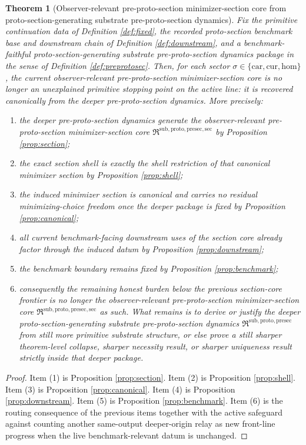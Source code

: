 \documentclass[11pt]{article}
\newcommand{\Car}{\mathrm{car}}
\newcommand{\Cur}{\mathrm{cur}}
\newcommand{\Hom}{\mathrm{hom}}
\newcommand{\PreProtoSectionPackage}{\mathfrak R^{\mathrm{sub,proto,presec}}}
\newcommand{\PreProtoSectionMinSectionCore}{\mathfrak R^{\mathrm{sub,proto,presec,sec}}}
\newtheorem{theorem}{Theorem}
\begin{document}
\begin{theorem}[Observer-relevant pre-proto-section minimizer-section core from proto-section-generating substrate pre-proto-section dynamics]
\label{thm:main}
Fix the primitive continuation data of Definition \ref{def:fixed}, the recorded proto-section benchmark base and downstream chain of Definition \ref{def:downstream}, and a benchmark-faithful proto-section-generating substrate pre-proto-section dynamics package in the sense of Definition \ref{def:preprotosec}. Then, for each sector \(\sigma\in\{\Car,\Cur,\Hom\}\), the current observer-relevant pre-proto-section minimizer-section core is no longer an unexplained primitive stopping point on the active line: it is recovered canonically from the deeper pre-proto-section dynamics. More precisely:
\begin{enumerate}
    \item the deeper pre-proto-section dynamics generate the observer-relevant pre-proto-section minimizer-section core \(\PreProtoSectionMinSectionCore\) by Proposition \ref{prop:section};
    \item the exact section shell is exactly the shell restriction of that canonical minimizer section by Proposition \ref{prop:shell};
    \item the induced minimizer section is canonical and carries no residual minimizing-choice freedom once the deeper package is fixed by Proposition \ref{prop:canonical};
    \item all current benchmark-facing downstream uses of the section core already factor through the induced datum by Proposition \ref{prop:downstream};
    \item the benchmark boundary remains fixed by Proposition \ref{prop:benchmark};
    \item consequently the remaining honest burden below the previous section-core frontier is no longer the observer-relevant pre-proto-section minimizer-section core \(\PreProtoSectionMinSectionCore\) as such. What remains is to derive or justify the deeper proto-section-generating substrate pre-proto-section dynamics \(\PreProtoSectionPackage\) from still more primitive substrate structure, or else prove a still sharper theorem-level collapse, sharper necessity result, or sharper uniqueness result strictly inside that deeper package.
\end{enumerate}
\end{theorem}

\begin{proof}
Item (1) is Proposition \ref{prop:section}. Item (2) is Proposition \ref{prop:shell}. Item (3) is Proposition \ref{prop:canonical}. Item (4) is Proposition \ref{prop:downstream}. Item (5) is Proposition \ref{prop:benchmark}. Item (6) is the routing consequence of the previous items together with the active safeguard against counting another same-output deeper-origin relay as new front-line progress when the live benchmark-relevant datum is unchanged.
\end{proof}
\end{document}
